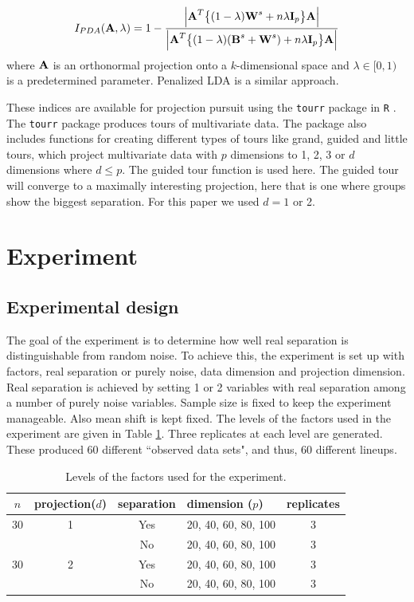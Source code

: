 \begin{eqnarray}
I_{PDA}(\mbox{\boldmath {\bf A}},\lambda) =
1-\frac{\Big|\mbox{\boldmath {\bf A}}^T\big\{(1-\lambda)\mbox{\boldmath {\bf W}}^s+n\lambda\mbox{\boldmath {\bf I}}_p\big\}
\mbox{\boldmath {\bf A}}\Big|}
              {\Big|\mbox{\boldmath {\bf A}}^T\big\{(1-\lambda)(\mbox{\boldmath {\bf B}}^s +\mbox{\boldmath {\bf W}}^s)+n\lambda\mbox{\boldmath {\bf I}}_p\big\} \mbox{\boldmath {\bf A}}\Big|}\label{PDA3}
\end{eqnarray}
where $\mbox{\boldmath {\bf A}}$ is an orthonormal projection onto a $k$-dimensional space
and $\lambda \in [0,1)$ is a predetermined parameter. Penalized LDA \citep{witten:2011} is a similar approach.

These indices are available for projection pursuit using the \texttt{tourr} package \citep{WC08} in \texttt{R} \citep{r}. The \texttt{tourr} package produces tours of multivariate data. The package also includes functions for creating different types of tours like grand, guided and little tours, which project multivariate data with $p$ dimensions to 1, 2, 3 or $d$ dimensions where $d \le p$. The guided tour function is used here. The guided tour will converge to a maximally interesting projection, here that is one where groups show the biggest separation. For this paper we used $d = 1$ or 2.    


\section{Experiment} \label{sec:experiment}

\subsection{Experimental design}

The goal of the experiment is to determine how well real separation is distinguishable from random noise. To achieve this, the experiment is set up with factors, real separation or purely noise, data dimension and projection dimension. Real separation is achieved by setting 1 or 2 variables with real separation among a number of purely noise variables.  Sample size is fixed to keep the experiment manageable. Also mean shift is kept fixed. The levels of the factors used in the experiment are given in Table \ref{freq}. Three replicates at each level are generated. These produced 60 different ``observed data sets", and thus, 60 different lineups. 

\begin{table}[htbp]
\begin{center}
\caption{Levels of the factors used for the experiment.}
\begin{tabular}{cccp{2.2cm}|c}
  \hline
  \hline
  $n$ & projection($d$) & separation & dimension ($p$) & replicates\\
  \hline
  30 & 1 & Yes & 20, 40, 60, 80, 100 & 3 \\
      & & No & 20, 40, 60, 80, 100 & 3\\
   30 & 2 & Yes & 20, 40, 60, 80, 100 & 3 \\
     & & No & 20, 40, 60, 80, 100 & 3\\   
      \hline
\end{tabular}
\label{freq}
\end{center}
\end{table} 


